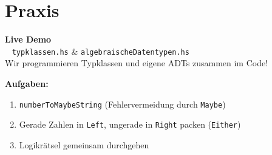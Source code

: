 \documentclass[aspectratio=169,11pt]{beamer}
\begin{document}
\section{Praxis}

\begin{frame}[plain]
    \begin{center}
        \Huge \textbf{Live Demo} \\
        \vspace{0.5cm}
        \large \faLaptopCode~ \texttt{typklassen.hs} \& \texttt{algebraischeDatentypen.hs} \\
        \vspace{0.3cm}
        \normalsize Wir programmieren Typklassen und eigene ADTs zusammen im Code!
    \end{center}
    
    \vspace{0.5cm}
    \textbf{Aufgaben:}
    \begin{enumerate}
        \item \texttt{numberToMaybeString} (Fehlervermeidung durch \texttt{Maybe})
        \item Gerade Zahlen in \texttt{Left}, ungerade in \texttt{Right} packen (\texttt{Either})
        \item Logikrätsel gemeinsam durchgehen
    \end{enumerate}
\end{frame}
\end{document}
